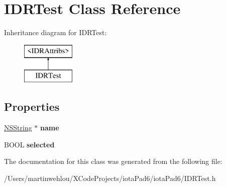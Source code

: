 \hypertarget{interface_i_d_r_test}{
\section{IDRTest Class Reference}
\label{interface_i_d_r_test}
}
Inheritance diagram for IDRTest:\begin{figure}[H]
\begin{center}
\leavevmode
\includegraphics[height=2.000000cm]{interface_i_d_r_test}
\end{center}
\end{figure}
\subsection*{Properties}
\begin{DoxyCompactItemize}
\item 
\hypertarget{interface_i_d_r_test_a6fb4b70d2a0772311a09aaa1f158a1fd}{
\hyperlink{class_n_s_string}{NSString} $\ast$ {\bfseries name}}
\label{interface_i_d_r_test_a6fb4b70d2a0772311a09aaa1f158a1fd}

\item 
\hypertarget{interface_i_d_r_test_a27dd0ac53b4afc31e275461a6b0196a8}{
BOOL {\bfseries selected}}
\label{interface_i_d_r_test_a27dd0ac53b4afc31e275461a6b0196a8}

\end{DoxyCompactItemize}


The documentation for this class was generated from the following file:\begin{DoxyCompactItemize}
\item 
/Users/martinwehlou/XCodeProjects/iotaPad6/iotaPad6/IDRTest.h\end{DoxyCompactItemize}
